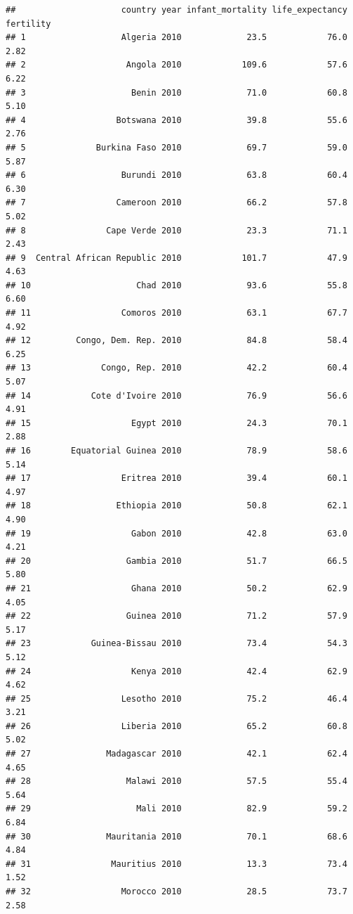 \documentclass[
]{article}
\begin{document}
\begin{verbatim}
##                     country year infant_mortality life_expectancy fertility
## 1                   Algeria 2010             23.5            76.0      2.82
## 2                    Angola 2010            109.6            57.6      6.22
## 3                     Benin 2010             71.0            60.8      5.10
## 4                  Botswana 2010             39.8            55.6      2.76
## 5              Burkina Faso 2010             69.7            59.0      5.87
## 6                   Burundi 2010             63.8            60.4      6.30
## 7                  Cameroon 2010             66.2            57.8      5.02
## 8                Cape Verde 2010             23.3            71.1      2.43
## 9  Central African Republic 2010            101.7            47.9      4.63
## 10                     Chad 2010             93.6            55.8      6.60
## 11                  Comoros 2010             63.1            67.7      4.92
## 12         Congo, Dem. Rep. 2010             84.8            58.4      6.25
## 13              Congo, Rep. 2010             42.2            60.4      5.07
## 14            Cote d'Ivoire 2010             76.9            56.6      4.91
## 15                    Egypt 2010             24.3            70.1      2.88
## 16        Equatorial Guinea 2010             78.9            58.6      5.14
## 17                  Eritrea 2010             39.4            60.1      4.97
## 18                 Ethiopia 2010             50.8            62.1      4.90
## 19                    Gabon 2010             42.8            63.0      4.21
## 20                   Gambia 2010             51.7            66.5      5.80
## 21                    Ghana 2010             50.2            62.9      4.05
## 22                   Guinea 2010             71.2            57.9      5.17
## 23            Guinea-Bissau 2010             73.4            54.3      5.12
## 24                    Kenya 2010             42.4            62.9      4.62
## 25                  Lesotho 2010             75.2            46.4      3.21
## 26                  Liberia 2010             65.2            60.8      5.02
## 27               Madagascar 2010             42.1            62.4      4.65
## 28                   Malawi 2010             57.5            55.4      5.64
## 29                     Mali 2010             82.9            59.2      6.84
## 30               Mauritania 2010             70.1            68.6      4.84
## 31                Mauritius 2010             13.3            73.4      1.52
## 32                  Morocco 2010             28.5            73.7      2.58

\end{verbatim}
\end{document}
